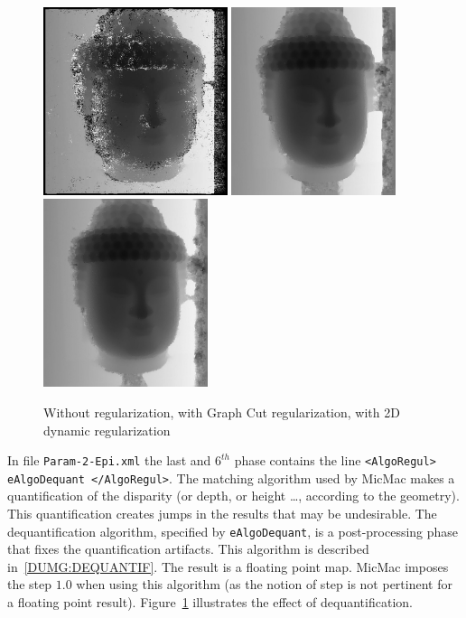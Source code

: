 \begin{figure}
\begin{center}
\includegraphics[height=55mm]{FIGS/Boudhas/Px1_MR_Num5.jpg}
\includegraphics[height=55mm]{FIGS/Boudhas/Px1_REGUL_Num5.jpg}
\includegraphics[height=55mm]{FIGS/Boudhas/PX1-Regul-ProgDyn.jpg}
\caption{Without regularization, with Graph Cut regularization,
with 2D dynamic regularization}
\label{FIG:DISP:REGUL}
\end{center}
\end{figure}


In file {\tt Param-2-Epi.xml} the last and $6^{th}$ phase contains
the line {\tt <AlgoRegul>    eAlgoDequant    </AlgoRegul>}.
The matching algorithm used by MicMac makes a quantification
of the disparity (or depth, or height \dots, according to the geometry).
This quantification creates jumps in the results that may be undesirable.
The dequantification algorithm, specified by {\tt  eAlgoDequant}, is
a post-processing phase that fixes
the quantification artifacts.
This algorithm is described in~\ref{DUMG:DEQUANTIF}. The result is
a floating point map. MicMac imposes the step $1.0$ when using this algorithm
(as the notion of step is not pertinent for a floating point
result). Figure~\ref{FIG:DISP:REGUL} illustrates the effect of dequantification.




